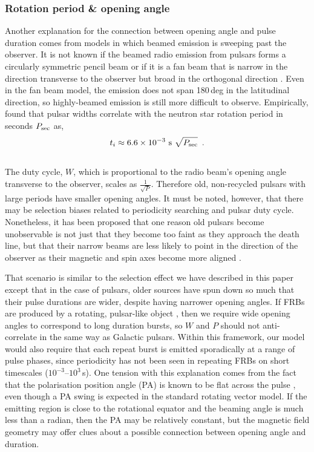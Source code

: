 \documentclass[fleqn,usenatbib]{mnras}
\begin{document}
\subsubsection{Rotation period \& opening angle}
Another explanation for the connection between 
opening angle and pulse duration comes from models in which 
beamed emission is sweeping past the observer.
It is not known if the beamed radio emission from 
pulsars forms a circularly symmetric pencil beam 
\citep{rankin-1990} or if it is a fan beam that
is narrow in the direction transverse to the observer 
but broad in the orthogonal direction \citep{michel-1987,wang-2014, oswald-2019}. Even in the fan beam model, 
the emission does not span 180\,deg in the latitudinal 
direction, so highly-beamed emission is still more difficult 
to observe.
Empirically, \citet{rankin-1990} found that 
pulsar widths correlate with the neutron star 
rotation period in seconds $P_{\rm sec}$ as,
\\
\begin{equation}
    t_i \approx 6.6\times10^{-3}\,\,\mathrm{s}\,\,\sqrt{P_{\rm sec}}\,\,\,.
\end{equation}
\\
\noindent The duty cycle, $W$, 
which is proportional to the radio 
beam's opening angle transverse 
to the observer, scales as $\frac{1}{\sqrt{P}}$. 
Therefore old, non-recycled pulsars with large 
periods have smaller opening angles. It must be noted, 
however, that there may be selection biases related to 
periodicity searching and pulsar duty cycle. 
Nonetheless, it has been proposed that one reason old pulsars 
become unobservable is not just that they become too 
faint as they approach the death line, but 
that their narrow beams are less likely to 
point in the direction of the observer 
as their magnetic and spin axes become more aligned \citep{johnston-2017}. 

That scenario 
is similar to the selection effect we have
described in this paper except that in the case of pulsars, older sources 
have spun down so much that their pulse durations are wider, despite having 
narrower opening angles. If FRBs are produced by a rotating, pulsar-like object \citep{cordes-2016, kumar-lu-2017}, 
then we require wide opening angles to correspond to long duration bursts, 
so $W$ and $P$ should not anti-correlate in the same way as 
Galactic pulsars. 
Within this framework, our model would also require that each repeat burst 
is emitted sporadically at a range of pulse phases, since 
periodicity has not been seen in repeating FRBs on short timescales ($10^{-3}$--$10^{3}$\,s). One tension with this explanation comes from 
the fact that the polarisation position angle (PA) is known to be flat across 
the pulse \citep{michilli2018, chime19-8repeaters}, even though 
a PA swing is expected in the standard rotating vector model. 
If the emitting region is close to the rotational 
equator and the beaming angle is much less than a radian, 
then the PA may be relatively constant, but the magnetic field geometry may 
offer clues about a possible connection between opening angle and 
duration.
\end{document}
